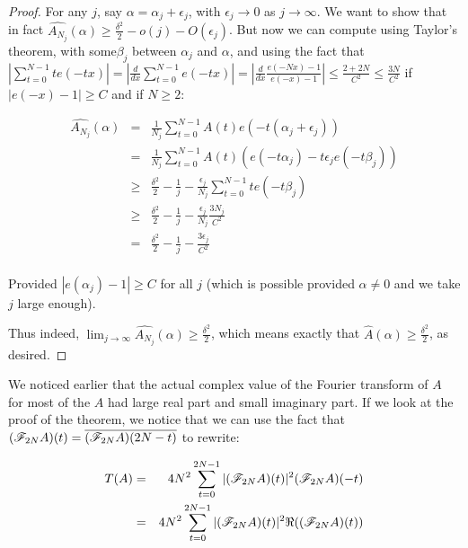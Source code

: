 \documentclass{article}
\theoremstyle{definition}
\theoremstyle{remark}
\numberwithin{equation}{section}
\begin{document}
{\begin{proof}
  For any $j$, say $\alpha = \alpha_j + \epsilon_j$, with
  $\epsilon_j \to 0$ as $j \to \infty$.  We want to show that in fact
  $\widehat{A_{N_j}}(\alpha) \geq \frac{\delta^2}{2} - o(j) -
  O(\epsilon_j)$.  But now we can compute using Taylor's theorem, with
  some$\beta_j$ between $\alpha_j$ and $\alpha$, and using the fact
  that
  $\left|\sum_{t=0}^{N-1} t e(-tx)\right| =
  \left|\frac{d}{dx}\sum_{t=0}^{N-1} e(-tx)\right| =
  \left|\frac{d}{dx} \frac{e(-Nx) -1}{e(-x)-1}\right| \leq
  \frac{2+2N}{C^2} \leq \frac{3N}{C^2}$ if $|e(-x)-1| \geq C$ and if
  $N \geq 2$:

  \begin{eqnarray*}
    \widehat{A_{N_j}}(\alpha) &=& \frac{1}{N_j} \sum_{t=0}^{N-1} A(t)
                                  e(-t(\alpha_j+\epsilon_j))\\
                              &=& \frac{1}{N_j} \sum_{t=0}^{N-1} A(t)
                                  (e(-t\alpha_j)-t\epsilon_je(-t\beta_j))\\
                              &\geq& \frac{\delta^2}{2} - \frac{1}{j}
                                     - \frac{\epsilon_j}{N_j} \sum_{t=0}^{N-1}
                                     t e(-t\beta_j)\\
                              &\geq& \frac{\delta^2}{2} - \frac{1}{j}
                                     - \frac{\epsilon_j}{N_j} \frac{3N_j}{C^2}\\
                              &=& \frac{\delta^2}{2} - \frac{1}{j}
                                  - \frac{3\epsilon_j}{C^2}\\
  \end{eqnarray*}

  Provided $|e(\alpha_j) - 1| \geq C$ for all $j$ (which is possible
  provided $\alpha \neq 0$ and we take $j$ large enough).

  Thus indeed,
  $\lim_{j \to \infty} \widehat{A_{N_j}}(\alpha) \geq
  \frac{\delta^2}{2}$, which means exactly that
  $\widehat{A}(\alpha) \geq \frac{\delta^2}{2}$, as desired.
\end{proof}
}
We noticed earlier that the actual complex value of the Fourier
transform of $A$ for most of the $A$ had large real part and small
imaginary part.  If we look at the proof of the theorem, we notice
that we can use the fact that
$(\mathscr{F}_{2N}A)(t) = \overline{(\mathscr{F}_{2N}A)(2N-t)}$ to rewrite:

\begin{eqnarray*}
T(A) &=& 4 N^2 \sum_{t=0}^{2N-1} |(\mathscr{F}_{2N}A)(t)|^2(\mathscr{F}_{2N}A)(-t)\\
 &=& 4 N^2 \sum_{t=0}^{2N-1} |(\mathscr{F}_{2N}A)(t)|^2\Re((\mathscr{F}_{2N}A)(t))
\end{eqnarray*}
\end{document}

